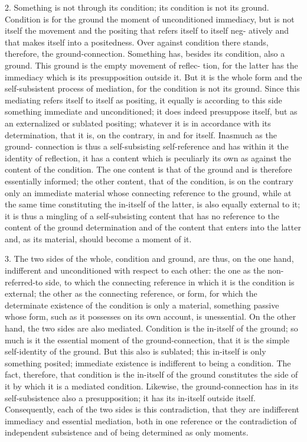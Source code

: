 2. Something is not through its condition; its condition is not its ground.
Condition is for the ground the moment of unconditioned immediacy, but
is not itself the movement and the positing that refers itself to itself neg-
atively and that makes itself into a positedness. Over against condition
there stands, therefore, the ground-connection. Something has, besides its
condition, also a ground.  This ground is the empty movement of reflec-
tion, for the latter has the immediacy which is its presupposition outside
it. But it is the whole form and the self-subsistent process of mediation,
for the condition is not its ground. Since this mediating refers itself to
itself as positing, it equally is according to this side something immediate
and unconditioned; it does indeed presuppose itself, but as an externalized
or sublated positing; whatever it is in accordance with its determination,
that it is, on the contrary, in and for itself.  Inasmuch as the ground-
connection is thus a self-subsisting self-reference and has within it the
identity of reflection, it has a content which is peculiarly its own as against
the content of the condition. The one content is that of the ground and is
therefore essentially informed; the other content, that of the condition, is
on the contrary only an immediate material whose connecting reference to
the ground, while at the same time constituting the in-itself of the latter, is
also equally external to it; it is thus a mingling of a self-subsisting content
that has no reference to the content of the ground determination and of
the content that enters into the latter and, as its material, should become
a moment of it.

3. The two sides of the whole, condition and ground, are thus, on the one
hand, indifferent and unconditioned with respect to each other: the one as
the non-referred-to side, to which the connecting reference in which it is
the condition is external; the other as the connecting reference, or form,
for which the determinate existence of the condition is only a material,
something passive whose form, such as it possesses on its own account, is
unessential. On the other hand, the two sides are also mediated. Condition
is the in-itself of the ground; so much is it the essential moment of the
ground-connection, that it is the simple self-identity of the ground. But this
also is sublated; this in-itself is only something posited; immediate existence
is indifferent to being a condition. The fact, therefore, that condition is the
in-itself of the ground constitutes the side of it by which it is a mediated
condition. Likewise, the ground-connection has in its self-subsistence also
a presupposition; it has its in-itself outside itself.  Consequently, each
of the two sides is this contradiction, that they are indifferent immediacy
and essential mediation, both in one reference  or the contradiction of
independent subsistence and of being determined as only moments.

